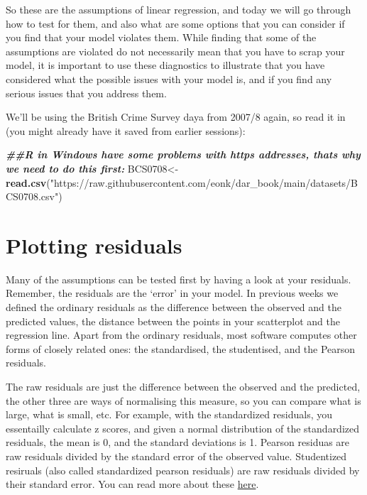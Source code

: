 \documentclass[
]{book}
\newenvironment{Shaded}{\begin{snugshade}}{\end{snugshade}}
\newcommand{\DocumentationTok}[1]{\textcolor[rgb]{0.56,0.35,0.01}{\textbf{\textit{#1}}}}
\newcommand{\FunctionTok}[1]{\textcolor[rgb]{0.13,0.29,0.53}{\textbf{#1}}}
\newcommand{\NormalTok}[1]{#1}
\newcommand{\OtherTok}[1]{\textcolor[rgb]{0.56,0.35,0.01}{#1}}
\newcommand{\StringTok}[1]{\textcolor[rgb]{0.31,0.60,0.02}{#1}}
\begin{document}
So these are the assumptions of linear regression, and today we will go through how to test for them, and also what are some options that you can consider if you find that your model violates them. While finding that some of the assumptions are violated do not necessarily mean that you have to scrap your model, it is important to use these diagnostics to illustrate that you have considered what the possible issues with your model is, and if you find any serious issues that you address them.

We'll be using the British Crime Survey daya from 2007/8 again, so read it in (you might already have it saved from earlier sessions):

\begin{Shaded}
\begin{Highlighting}[]
\DocumentationTok{\#\#R in Windows have some problems with https addresses, that\textquotesingle{}s why we need to do this first:}
\NormalTok{BCS0708}\OtherTok{\textless{}{-}}\FunctionTok{read.csv}\NormalTok{(}\StringTok{"https://raw.githubusercontent.com/eonk/dar\_book/main/datasets/BCS0708.csv"}\NormalTok{)}
\end{Highlighting}
\end{Shaded}

\section{Plotting residuals}\label{plotting-residuals}

Many of the assumptions can be tested first by having a look at your residuals. Remember, the residuals are the `error' in your model. In previous weeks we defined the ordinary residuals as the difference between the observed and the predicted values, the distance between the points in your scatterplot and the regression line. Apart from the ordinary residuals, most software computes other forms of closely related ones: the standardised, the studentised, and the Pearson residuals.

The raw residuals are just the difference between the observed and the predicted, the other three are ways of normalising this measure, so you can compare what is large, what is small, etc. For example, with the standardized residuals, you essentailly calculate z scores, and given a normal distribution of the standardized residuals, the mean is 0, and the standard deviations is 1.
Pearson residuas are raw residuals divided by the standard error of the observed value.
Studentized resiruals (also called standardized pearson residuals) are raw residuals divided by their standard error.
You can read more about these \href{https://r-forge.r-project.org/scm/viewvc.php/*checkout*/pkg/BinomTools/inst/ResidualsGLM.pdf?revision=6&root=binomtools&pathrev=6}{here}.
\end{document}
